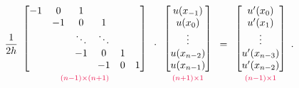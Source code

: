 \begin{align}
\frac{1}{2h}
\begin{array}{c}
\begin{bmatrix}
-1 &0 & 1 & \\
& -1 & 0 & 1  \\
& & \ddots&\ddots & \\
& & -1 & 0 & 1 \\
& & & -1 & 0 & 1
\end{bmatrix}\\
{\scriptstyle\textcolor{red}{(n-1)\times(n+1)}}
\end{array}\cdot
\begin{array}{c}
\begin{bmatrix}
u(x_{-1}) \\ u(x_0)\\ \vdots  \\ u(x_{n-2}) \\ u(x_{n-1})
\end{bmatrix}\\
{\scriptstyle\textcolor{red}{(n+1)\times1}}
\end{array}=
\begin{array}{c}
\begin{bmatrix}
u'(x_0) \\ u'(x_1)\\ \vdots  \\ u'(x_{n-3}) \\ u'(x_{n-2})
\end{bmatrix}\\
{\scriptstyle\textcolor{red}{(n-1)\times1}}
\end{array}.
\label{finitedifference2:up}
\end{align}

